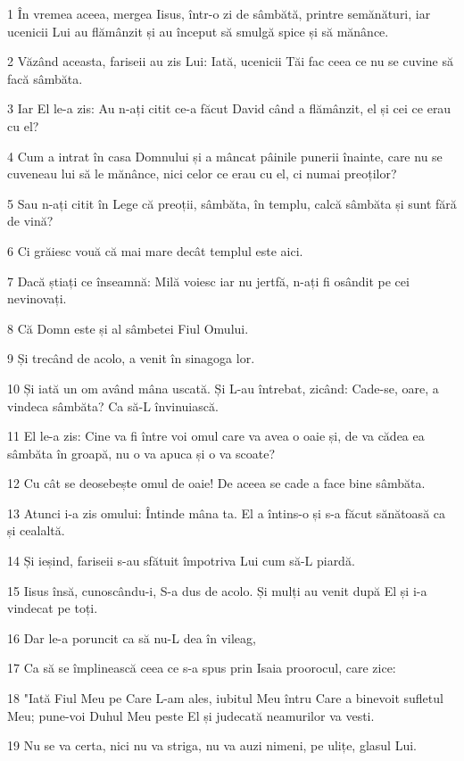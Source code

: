 \par 1 În vremea aceea, mergea Iisus, într-o zi de sâmbătă, printre semănături, iar ucenicii Lui au flămânzit și au început să smulgă spice și să mănânce.
\par 2 Văzând aceasta, fariseii au zis Lui: Iată, ucenicii Tăi fac ceea ce nu se cuvine să facă sâmbăta.
\par 3 Iar El le-a zis: Au n-ați citit ce-a făcut David când a flămânzit, el și cei ce erau cu el?
\par 4 Cum a intrat în casa Domnului și a mâncat pâinile punerii înainte, care nu se cuveneau lui să le mănânce, nici celor ce erau cu el, ci numai preoților?
\par 5 Sau n-ați citit în Lege că preoții, sâmbăta, în templu, calcă sâmbăta și sunt fără de vină?
\par 6 Ci grăiesc vouă că mai mare decât templul este aici.
\par 7 Dacă știați ce înseamnă: Milă voiesc iar nu jertfă, n-ați fi osândit pe cei nevinovați.
\par 8 Că Domn este și al sâmbetei Fiul Omului.
\par 9 Și trecând de acolo, a venit în sinagoga lor.
\par 10 Și iată un om având mâna uscată. Și L-au întrebat, zicând: Cade-se, oare, a vindeca sâmbăta? Ca să-L învinuiască.
\par 11 El le-a zis: Cine va fi între voi omul care va avea o oaie și, de va cădea ea sâmbăta în groapă, nu o va apuca și o va scoate?
\par 12 Cu cât se deosebește omul de oaie! De aceea se cade a face bine sâmbăta.
\par 13 Atunci i-a zis omului: Întinde mâna ta. El a întins-o și s-a făcut sănătoasă ca și cealaltă.
\par 14 Și ieșind, fariseii s-au sfătuit împotriva Lui cum să-L piardă.
\par 15 Iisus însă, cunoscându-i, S-a dus de acolo. Și mulți au venit după El și i-a vindecat pe toți.
\par 16 Dar le-a poruncit ca să nu-L dea în vileag,
\par 17 Ca să se împlinească ceea ce s-a spus prin Isaia proorocul, care zice:
\par 18 "Iată Fiul Meu pe Care L-am ales, iubitul Meu întru Care a binevoit sufletul Meu; pune-voi Duhul Meu peste El și judecată neamurilor va vesti.
\par 19 Nu se va certa, nici nu va striga, nu va auzi nimeni, pe ulițe, glasul Lui.
